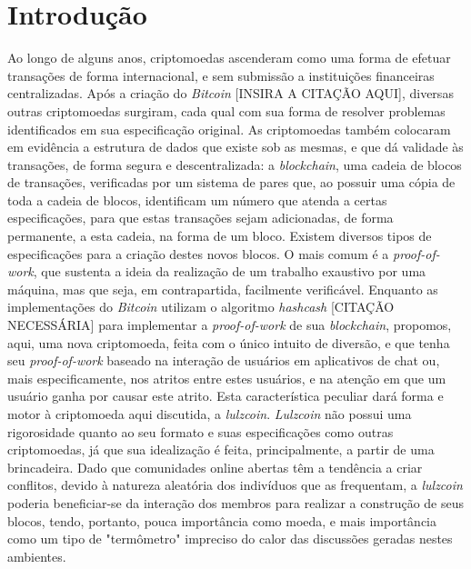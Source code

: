\documentclass[conference]{IEEEtran}
\begin{document}

\IEEEpeerreviewmaketitle



\section{Introdução}
Ao longo de alguns anos, criptomoedas ascenderam como uma forma de efetuar transações de forma internacional, e sem submissão a instituições financeiras centralizadas. Após a criação do \textit{Bitcoin} [INSIRA A CITAÇÃO AQUI], diversas outras criptomoedas surgiram, cada qual com sua forma de resolver problemas identificados em sua especificação original.
As criptomoedas também colocaram em evidência a estrutura de dados que existe sob as mesmas, e que dá validade às transações, de forma segura e descentralizada: a \textit{blockchain}, uma cadeia de blocos de transações, verificadas por um sistema de pares que, ao possuir uma cópia de toda a cadeia de blocos, identificam um número que atenda a certas especificações, para que estas transações sejam adicionadas, de forma permanente, a esta cadeia, na forma de um bloco.
Existem diversos tipos de especificações para a criação destes novos blocos. O mais comum é a \textit{proof-of-work}, que sustenta a ideia da realização de um trabalho exaustivo por uma máquina, mas que seja, em contrapartida, facilmente verificável.
Enquanto as implementações do \textit{Bitcoin} utilizam o algoritmo \textit{hashcash} [CITAÇÃO NECESSÁRIA] para implementar a \textit{proof-of-work} de sua \textit{blockchain}, propomos, aqui, uma nova criptomoeda, feita com o único intuito de diversão, e que tenha seu \textit{proof-of-work} baseado na interação de usuários em aplicativos de chat ou, mais especificamente, nos atritos entre estes usuários, e na atenção em que um usuário ganha por causar este atrito. Esta característica peculiar dará forma e motor à criptomoeda aqui discutida, a \textit{lulzcoin}.
\textit{Lulzcoin} não possui uma rigorosidade quanto ao seu formato e suas especificações como outras criptomoedas, já que sua idealização é feita, principalmente, a partir de uma brincadeira. Dado que comunidades online abertas têm a tendência a criar conflitos, devido à natureza aleatória dos indivíduos que as frequentam, a \textit{lulzcoin} poderia beneficiar-se da interação dos membros para realizar a construção de seus blocos, tendo, portanto, pouca importância como moeda, e mais importância como um tipo de "termômetro" impreciso do calor das discussões geradas nestes ambientes.
\end{document}
